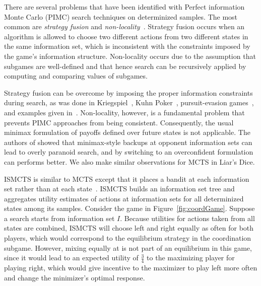 \documentclass[letterpaper]{article}
\begin{document}

There are several problems that have been identified with Perfect information Monte Carlo (PIMC) search techniques
on determinized samples. The most common are {\it strategy fusion} and {\it non-locality}~\cite{Frank98Finding}.
Strategy fusion occurs when an algorithm is allowed to choose two different actions from two different states in the same 
information set, which is inconsistent with the constraints imposed by the game's information structure. 
Non-locality occurs due to the assumption that subgames are well-defined and that hence search can be 
recursively applied by computing and comparing values of subgames. 

Strategy fusion can be overcome by imposing the proper information constraints during search, as was done in 
Kriegspiel~\cite{Ciancarini10Kriegspiel}, Kuhn Poker~\cite{Ponsen11Computing}, pursuit-evasion games~\cite{Lisy12peg}, 
and examples given in~\cite{Cowling12ISMCTS}. 
Non-locality, however, is a fundamental problem that prevents PIMC approaches from being consistent.
Consequently, the usual minimax formulation of payoffs defined over future states is not applicable.  
The authors of \cite{Parker10iss,Parker06Overconfidence} showed that minimax-style backups at opponent information 
sets can lead to overly paranoid search, and by switching to an overconfident formulation can performs better.
We also make similar observations for MCTS in Liar's Dice. 

ISMCTS is similar to MCTS except that it places a bandit at each information set rather than at each 
state~\cite{Cowling12ISMCTS}. ISMCTS builds an information set tree and aggregates utility estimates of actions 
at information sets for all determinized states among its samples. 
Consider the game in Figure~\ref{fig:coordGame}. 
Suppose a search starts from information set $I$. Because utilities for actions taken from all states are combined, 
ISMCTS will choose left and right equally as often for both players, which would correspond to the equilibrium 
strategy in the coordination subgame. However, mixing equally at is not part of an equilibrium in this game, since
it would lead to an expected utility of $\frac{3}{4}$ to the maximizing player for playing right, which 
would give incentive to the maximizer to play left more often and change the minimizer's optimal response.  
\end{document}
